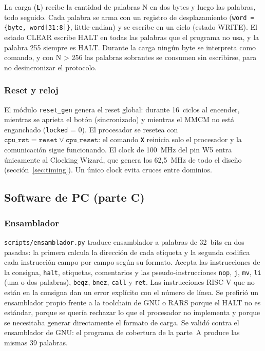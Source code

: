 \documentclass[12pt,a4paper]{article}
\newcommand{\cmd}[1]{\textbf{\texttt{#1}}}
\begin{document}
La carga (\cmd{L}) recibe la cantidad de palabras N en dos bytes y luego las
palabras, todo seguido. Cada palabra se arma con un registro de desplazamiento
(\texttt{word = \{byte, word[31:8]\}}, little-endian) y se escribe en un ciclo
(estado WRITE). El estado CLEAR escribe HALT en todas las palabras que el
programa no usa, y la palabra 255 siempre es HALT. Durante la carga ningún byte
se interpreta como comando, y con N > 256 las palabras sobrantes se consumen
sin escribirse, para no desincronizar el protocolo.

\subsubsection{Reset y reloj}

El módulo \texttt{reset\_gen} genera el reset global: durante 16~ciclos al
encender, mientras se aprieta el botón (sincronizado) y mientras el MMCM no
está enganchado (\texttt{locked} = 0). El procesador se resetea con
\(\texttt{cpu\_rst} = \texttt{reset} \lor \texttt{cpu\_reset}\): el comando \cmd{X}
reinicia solo el procesador y la comunicación sigue funcionando. El clock de
100~MHz del pin W5 entra únicamente al Clocking Wizard, que genera los 62,5~MHz
de todo el diseño (sección~\ref{sec:timing}). Un único clock evita cruces entre
dominios.

\subsection{Software de PC (parte C)}

\subsubsection{Ensamblador}

\texttt{scripts/ensamblador.py} traduce ensamblador a palabras de 32~bits en
dos pasadas: la primera calcula la dirección de cada etiqueta y la segunda
codifica cada instrucción campo por campo según su formato. Acepta las
instrucciones de la consigna, \texttt{halt}, etiquetas, comentarios y las
pseudo-instrucciones \texttt{nop}, \texttt{j}, \texttt{mv}, \texttt{li} (una o
dos palabras), \texttt{beqz}, \texttt{bnez}, \texttt{call} y \texttt{ret}. Las
instrucciones RISC-V que no están en la consigna dan un error explícito con el
número de línea. Se prefirió un ensamblador propio frente a la toolchain de GNU
o RARS porque el HALT no es estándar, porque se quería rechazar lo que el
procesador no implementa y porque se necesitaba generar directamente el formato
de carga. Se validó contra el ensamblador de GNU: el programa de cobertura de
la parte~A produce las mismas 39 palabras.
\end{document}
